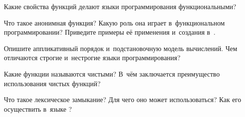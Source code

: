 \begin{Queeze}
  \item Какие свойства функций делают языки программирования функциональными?
  \item Что такое анонимная функция? Какую роль она играет в~функциональном программировании? Приведите примеры её применения и~создания в~\Scheme.
  \item Опишите аппликативный порядок и~подстановочную модель вычислений. Чем отличаются строгие и~нестрогие языки программирования?
  \item Какие функции называются чистыми? В~чём заключается преимущество использования чистых функций?
  \item Что такое лексическое замыкание? Для чего оно может использоваться? Как его осуществить в~языке \Scheme?
\end{Queeze}


